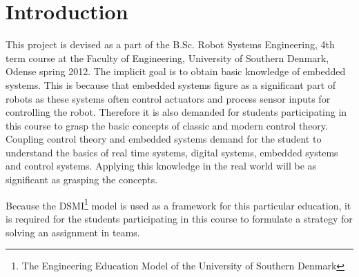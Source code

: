 \chapter{Introduction}\label{chap:intro}

This project is devised as a part of the B.Sc. Robot Systems Engineering, 4th term course at the Faculty of Engineering, University of Southern Denmark, Odense spring 2012. The implicit goal is to obtain basic knowledge of embedded systems. This is because that embedded systems figure as a significant part of robots as these systems often control actuators and process sensor inputs for controlling the robot. Therefore it is also demanded for students participating in this course to grasp the basic concepts of classic and modern control theory. Coupling control theory and embedded systems demand for the student to understand the basics of real time systems, digital systems, embedded systems and control systems. Applying this knowledge in the real world will be as significant as grasping the concepts.

Because the DSMI\footnote{The Engineering Education Model of the University of Southern Denmark} model is used as a framework for this particular education, it is required for the students participating in this course to formulate a strategy for solving an assignment in teams.

